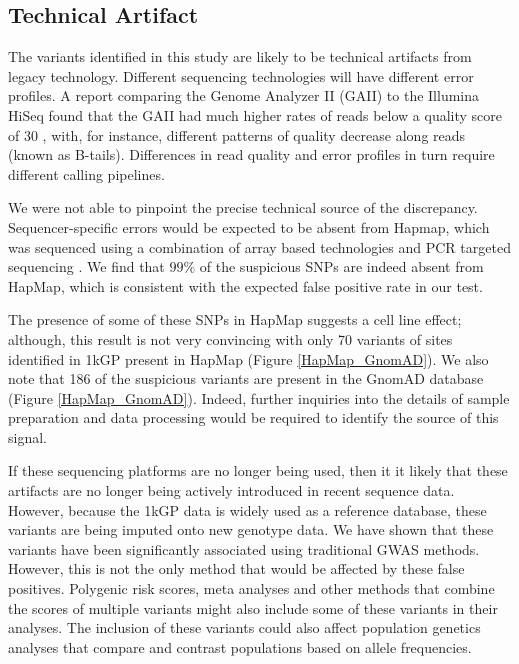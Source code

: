 \documentclass[9pt,lineno]{elife}
\begin{document}
\subsection{Technical Artifact}
The variants identified in this study are likely to be technical artifacts from legacy technology.
Different sequencing technologies will have different error profiles. 
A report comparing the Genome Analyzer II (GAII) to the Illumina HiSeq found that the GAII had much higher rates of reads below a quality score of 30 \citep{Minoche2011}, with, for instance, different patterns of quality decrease along reads (known as B-tails). 
Differences in read quality and error profiles in turn require different calling pipelines.

We were not able to pinpoint the precise technical source of the discrepancy. 
Sequencer-specific errors would be expected to be absent from Hapmap, which was sequenced using a combination of array based technologies and PCR targeted sequencing \citep{HapMap2005}. 
We find that $99\%$ of the suspicious SNPs are indeed absent from HapMap, which is consistent with the expected false positive rate in our test.
  
The presence of some of these SNPs in HapMap suggests a cell line effect; although, this result is not very convincing with only 70 variants of sites identified in 1kGP present in HapMap (Figure \ref{HapMap_GnomAD}).
We also note that 186 of the suspicious variants are present in the GnomAD database (Figure \ref{HapMap_GnomAD}).
Indeed, further inquiries into the details of sample preparation and data processing would be required to identify the source of this signal.

If these sequencing platforms are no longer being used, then it it likely that these artifacts are no longer being actively introduced in recent sequence data.
However, because the 1kGP data is widely used as a reference database, these variants are being imputed onto new genotype data.
We have shown that these variants have been significantly associated using traditional GWAS methods.
However, this is not the only method that would be affected by these false positives. 
Polygenic risk scores, meta analyses and other methods that combine the scores of multiple variants might also include some of these variants in their analyses.
The inclusion of these variants could also affect population genetics analyses that compare and contrast populations based on allele frequencies.
\end{document}
